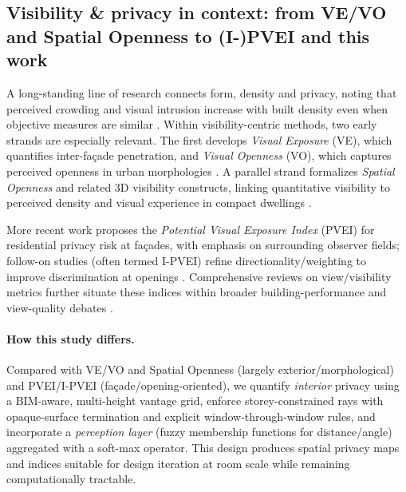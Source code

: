 \documentclass[final,3p,times,review]{elsarticle}
\begin{document}
\subsection{Visibility \& privacy in context: from VE/VO and Spatial Openness to (I-)PVEI and this work}
A long-standing line of research connects form, density and privacy, noting that perceived crowding and visual intrusion increase with built density even when objective measures are similar \citep{Churchman1999}. Within visibility-centric methods, two early strands are especially relevant. The first develops \textit{Visual Exposure} (VE), which quantifies inter-façade penetration, and \textit{Visual Openness} (VO), which captures perceived openness in urban morphologies \citep{ShachPinsly2007,ShachPinsly2011}. A parallel strand formalizes \textit{Spatial Openness} and related 3D visibility constructs, linking quantitative visibility to perceived density and visual experience in compact dwellings \citep{FisherGewirtzman2003a,FisherGewirtzman2003b,FisherGewirtzman2017,FisherGewirtzman2018}.

More recent work proposes the \textit{Potential Visual Exposure Index} (PVEI) for residential privacy risk at façades, with emphasis on surrounding observer fields; follow-on studies (often termed I-PVEI) refine directionality/weighting to improve discrimination at openings \citep{zheng2021,Zheng2023_IPVEI}. Comprehensive reviews on view/visibility metrics further situate these indices within broader building-performance and view-quality debates \citep{AbdAlhamid2023Review}.

\paragraph{How this study differs.}
Compared with VE/VO and Spatial Openness (largely exterior/morphological) and PVEI/I-PVEI (façade/opening-oriented), we quantify \emph{interior} privacy using a BIM-aware, multi-height vantage grid, enforce storey-constrained rays with opaque-surface termination and explicit window-through-window rules, and incorporate a \emph{perception layer} (fuzzy membership functions for distance/angle) aggregated with a soft-max operator. This design produces spatial privacy maps and indices suitable for design iteration at room scale while remaining computationally tractable.
\end{document}

